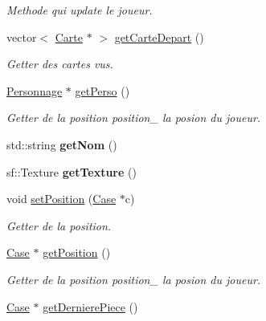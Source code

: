\begin{DoxyCompactItemize}
\begin{DoxyCompactList}\small\item\em \-Methode qui update le joueur. \end{DoxyCompactList}\item 
vector$<$ \hyperlink{classCarte}{\-Carte} $\ast$ $>$ \hyperlink{classJoueur_a60ec34b2d62e887fe0e56809b28c9c87}{get\-Carte\-Depart} ()
\begin{DoxyCompactList}\small\item\em \-Getter des cartes vus. \end{DoxyCompactList}\item 
\hypertarget{classJoueur_a255c6e4dc5071a176055ec819080b6d6}{\hyperlink{classPersonnage}{\-Personnage} $\ast$ \hyperlink{classJoueur_a255c6e4dc5071a176055ec819080b6d6}{get\-Perso} ()}\label{classJoueur_a255c6e4dc5071a176055ec819080b6d6}

\begin{DoxyCompactList}\small\item\em \-Getter de la position  position\-\_\- la posion du joueur. \end{DoxyCompactList}\item 
\hypertarget{classJoueur_a5ba8036208a35efd6bf37a86b36063b0}{std\-::string {\bfseries get\-Nom} ()}\label{classJoueur_a5ba8036208a35efd6bf37a86b36063b0}

\item 
\hypertarget{classJoueur_a04ffca29cd433b795e248eae8b04d2c1}{sf\-::\-Texture {\bfseries get\-Texture} ()}\label{classJoueur_a04ffca29cd433b795e248eae8b04d2c1}

\item 
void \hyperlink{classJoueur_aff78215b191d488c6555d100060fc2d6}{set\-Position} (\hyperlink{classCase}{\-Case} $\ast$c)
\begin{DoxyCompactList}\small\item\em \-Getter de la position. \end{DoxyCompactList}\item 
\hypertarget{classJoueur_a528cac966c6cfeab47e666ce3b2735c2}{\hyperlink{classCase}{\-Case} $\ast$ \hyperlink{classJoueur_a528cac966c6cfeab47e666ce3b2735c2}{get\-Position} ()}\label{classJoueur_a528cac966c6cfeab47e666ce3b2735c2}

\begin{DoxyCompactList}\small\item\em \-Getter de la position  position\-\_\- la posion du joueur. \end{DoxyCompactList}\item 
\hypertarget{classJoueur_a32909e93ab648b236fd670b8a24c5fb6}{\hyperlink{classCase}{\-Case} $\ast$ \hyperlink{classJoueur_a32909e93ab648b236fd670b8a24c5fb6}{get\-Derniere\-Piece} ()}\label{classJoueur_a32909e93ab648b236fd670b8a24c5fb6}


\end{DoxyCompactItemize}
